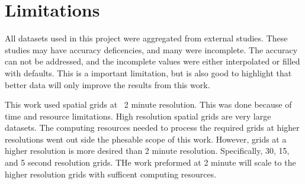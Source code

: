 \section{Limitations}
\setlength{\parindent}{10ex}
All datasets used in this project were aggregated from external studies.
These studies may have accuracy deficencies, and many were incomplete.
The accuracy can not be addressed, and the incomplete values were either interpolated or filled with defaults.
This is a important limitation, but is also good to highlight that better data will only improve the results from this work.

\par
This work used spatial grids at ~2 minute resolution.
This was done because of time and resource limitations.
High resolution spatial grids are very large datasets.
The computing resources needed to process the required grids at higher resolutions went out side the phesable scope of this work.
However, grids at a higher resolution is more desired than 2 minute resolution.
Specifically, 30, 15, and 5 second resolution grids.
THe work preformed at 2 minute will scale to the higher resolution grids with sufficent computing resources.
